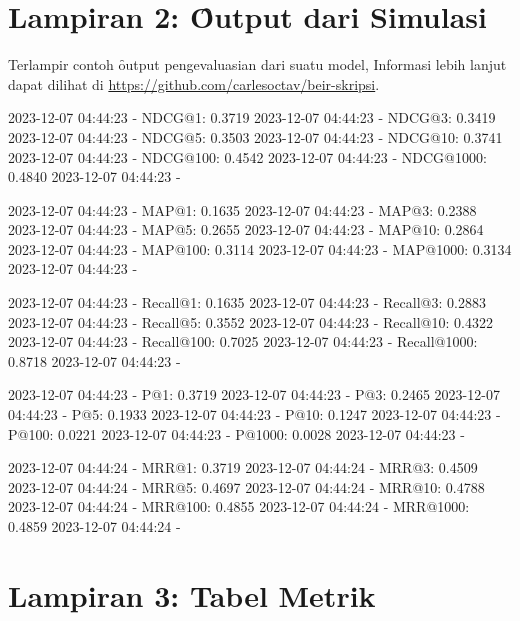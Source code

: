 
\chapter*{Lampiran 2: \f{Output} dari Simulasi}
\label{appendix:output}
Terlampir contoh \f{output} pengevaluasian dari suatu model, Informasi lebih lanjut dapat dilihat di \url{https://github.com/carlesoctav/beir-skripsi}.


2023-12-07 04:44:23 - NDCG@1: 0.3719
2023-12-07 04:44:23 - NDCG@3: 0.3419
2023-12-07 04:44:23 - NDCG@5: 0.3503
2023-12-07 04:44:23 - NDCG@10: 0.3741
2023-12-07 04:44:23 - NDCG@100: 0.4542
2023-12-07 04:44:23 - NDCG@1000: 0.4840
2023-12-07 04:44:23 - 

2023-12-07 04:44:23 - MAP@1: 0.1635
2023-12-07 04:44:23 - MAP@3: 0.2388
2023-12-07 04:44:23 - MAP@5: 0.2655
2023-12-07 04:44:23 - MAP@10: 0.2864
2023-12-07 04:44:23 - MAP@100: 0.3114
2023-12-07 04:44:23 - MAP@1000: 0.3134
2023-12-07 04:44:23 - 

2023-12-07 04:44:23 - Recall@1: 0.1635
2023-12-07 04:44:23 - Recall@3: 0.2883
2023-12-07 04:44:23 - Recall@5: 0.3552
2023-12-07 04:44:23 - Recall@10: 0.4322
2023-12-07 04:44:23 - Recall@100: 0.7025
2023-12-07 04:44:23 - Recall@1000: 0.8718
2023-12-07 04:44:23 - 

2023-12-07 04:44:23 - P@1: 0.3719
2023-12-07 04:44:23 - P@3: 0.2465
2023-12-07 04:44:23 - P@5: 0.1933
2023-12-07 04:44:23 - P@10: 0.1247
2023-12-07 04:44:23 - P@100: 0.0221
2023-12-07 04:44:23 - P@1000: 0.0028
2023-12-07 04:44:23 - 

2023-12-07 04:44:24 - MRR@1: 0.3719
2023-12-07 04:44:24 - MRR@3: 0.4509
2023-12-07 04:44:24 - MRR@5: 0.4697
2023-12-07 04:44:24 - MRR@10: 0.4788
2023-12-07 04:44:24 - MRR@100: 0.4855
2023-12-07 04:44:24 - MRR@1000: 0.4859
2023-12-07 04:44:24 - 




\chapter*{Lampiran 3: Tabel Metrik}
\label{appendix:metrik}

